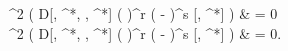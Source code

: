 \begin{lemma}
\label{lmm:formalism:func-wigner:zero-integrals}
	\begin{eqn*}
		\int \delta^2\Lambda
			\frac{\delta}{\delta \Lambda^\prime} \left(
				D[\Lambda, \Lambda^*, \Psi, \Psi^*]
				\left( \frac{\delta}{\delta \Lambda^\prime} \right)^r
				\left( -\frac{\delta}{\delta \Lambda^{\prime*}} \right)^s
				[\Lambda, \Lambda^*]
			\right)
		& = 0 \\
		\int \delta^2\Lambda
			\frac{\delta}{\delta \Lambda^{\prime*}}
			\left(
				D[\Lambda, \Lambda^*, \Psi, \Psi^*]
				\left( \frac{\delta}{\delta \Lambda^\prime} \right)^r
				\left( -\frac{\delta}{\delta \Lambda^{\prime*}} \right)^s
				[\Lambda, \Lambda^*]
			\right)
		& = 0.
	\end{eqn*}
\end{lemma}
